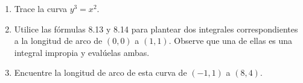 \item 
    \begin{enumerate}
        \item[(a)] Trace la curva $y^3 = x^2$.
        \item[(b)] Utilice las fórmulas 8.13 y 8.14 para plantear dos integrales correspondientes a la longitud de arco de $(0, 0)$ a $(1, 1)$. Observe que una de ellas es una integral impropia y evalúelas ambas.
        \item[(c)] Encuentre la longitud de arco de esta curva de $(-1, 1)$ a $(8, 4)$.
    \end{enumerate}
